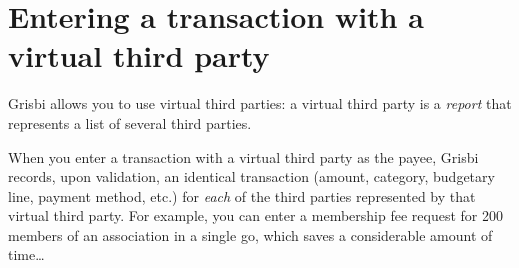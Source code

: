 \section{Entering a transaction with a virtual third party\label{transactions-virtualThird}}

Grisbi allows you to use virtual third parties: a virtual third party is a \emph{report} that represents a list of several third parties.

When you enter a transaction with a virtual third party as the payee, Grisbi records, upon validation, an identical transaction (amount, category, budgetary line, payment method, etc.) for \emph{each} of the third parties represented by that virtual third party. For example, you can enter a membership fee request for 200 members of an association in a single go, which saves a considerable amount of time\ldots

